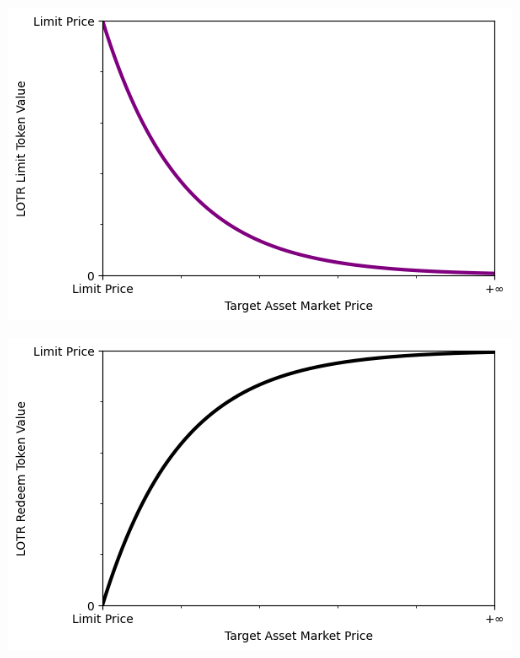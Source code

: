 \documentclass[12pt]{article}
\begin{document}
      \begin{center}
      \includegraphics[scale=0.6]{graph_limit_above.png}
      \end{center}
      \begin{center}
      \includegraphics[scale=0.6]{graph_redeem_above.png}
      \end{center}
\end{document}
